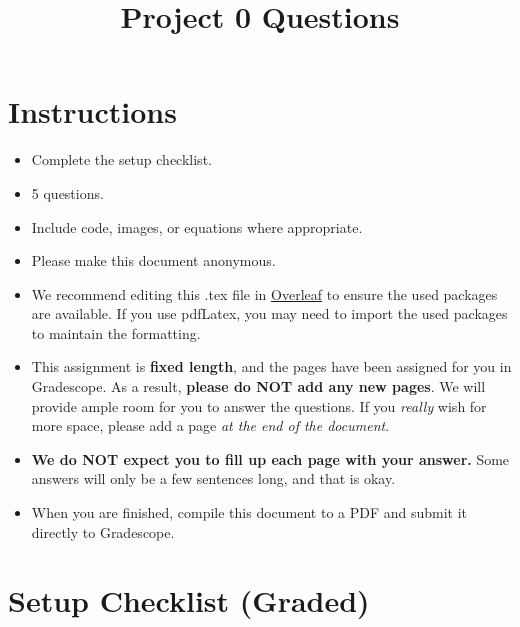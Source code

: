 \documentclass[11pt]{article}
\date{}
\title{\vspace{-1cm}Project 0 Questions}
\begin{document}
\maketitle
\vspace{-2cm}
\thispagestyle{fancy}

\section*{Instructions}
\begin{itemize}
  \item Complete the setup checklist.
  \item 5 questions.
  \item Include code, images, or equations where appropriate.
  \item Please make this document anonymous.
  \item We recommend editing this .tex file in \href{https://www.overleaf.com/}{Overleaf} to ensure the used packages are available. If you use pdfLatex, you may need to import the used packages to maintain the formatting.
  \item This assignment is \textbf{fixed length}, and the pages have been assigned for you in Gradescope. As a result, \textbf{please do NOT add any new pages}. We will provide ample room for you to answer the questions. If you \emph{really} wish for more space, please add a page \emph{at the end of the document}.
  \item \textbf{We do NOT expect you to fill up each page with your answer.} Some answers will only be a few sentences long, and that is okay.
  \item When you are finished, compile this document to a PDF and submit it directly to Gradescope.

\end{itemize}

\section*{Setup Checklist (Graded)}
\end{document}

